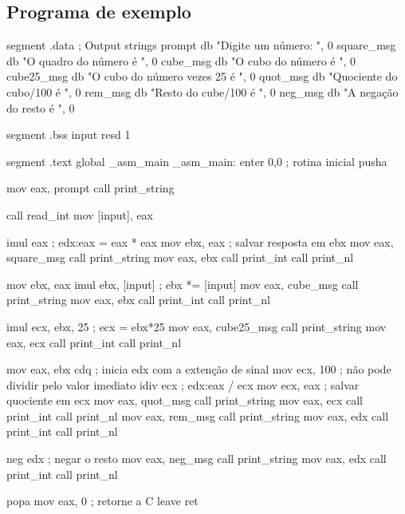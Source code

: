 \subsection{Programa de exemplo}
\begin{AsmCodeListing}[label=math.asm]
segment .data         ; Output strings
prompt          db    "Digite um número: ", 0
square_msg      db    "O quadro do número é ", 0
cube_msg        db    "O cubo do número é ", 0
cube25_msg      db    "O cubo do número vezes 25 é ", 0
quot_msg        db    "Quociente do cubo/100 é ", 0
rem_msg         db    "Resto do cube/100 é ", 0
neg_msg         db    "A negação do resto é ", 0

segment .bss
input   resd 1

segment .text
        global  _asm_main
_asm_main:
        enter   0,0               ; rotina inicial
	pusha

        mov     eax, prompt
        call    print_string

        call    read_int
        mov     [input], eax

        imul    eax               ; edx:eax = eax * eax
        mov     ebx, eax          ; salvar resposta em ebx
        mov     eax, square_msg
        call    print_string
        mov     eax, ebx
        call    print_int
        call    print_nl

        mov     ebx, eax
        imul    ebx, [input]      ; ebx *= [input]
        mov     eax, cube_msg
        call    print_string
        mov     eax, ebx
        call    print_int
        call    print_nl

        imul    ecx, ebx, 25      ; ecx = ebx*25
        mov     eax, cube25_msg
        call    print_string
        mov     eax, ecx
        call    print_int
        call    print_nl

        mov     eax, ebx
        cdq                       ; inicia edx com a extenção de sinal
        mov     ecx, 100          ; não pode dividir pelo valor imediato
        idiv    ecx               ; edx:eax / ecx
        mov     ecx, eax          ; salvar quociente em ecx
        mov     eax, quot_msg
        call    print_string
        mov     eax, ecx
        call    print_int
        call    print_nl
        mov     eax, rem_msg
        call    print_string
        mov     eax, edx
        call    print_int
        call    print_nl
        
        neg     edx               ; negar o resto
        mov     eax, neg_msg
        call    print_string
        mov     eax, edx
        call    print_int
        call    print_nl

        popa
        mov     eax, 0            ; retorne a C
        leave                     
        ret
\end{AsmCodeListing}

